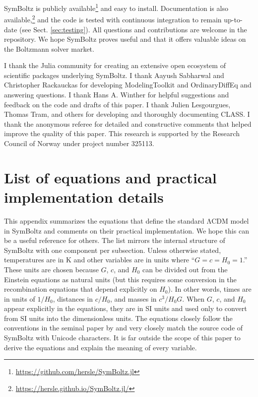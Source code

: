 \documentclass{aa}
\newcommand{\LCDM}{$\mathrm{\Lambda C D M}$}
\begin{document}
SymBoltz is publicly available\footnote{\url{https://github.com/hersle/SymBoltz.jl}} and easy to install.
Documentation is also available,\footnote{\url{https://hersle.github.io/SymBoltz.jl/}} and the code is tested with continuous integration to remain up-to-date (see Sect. \ref{sec:testing}).
All questions and contributions are welcome in the repository.
We hope SymBoltz proves useful and that it offers valuable ideas on the Boltzmann solver market.

\begin{acknowledgements}
I thank the Julia community for creating an extensive open ecosystem of scientific packages underlying SymBoltz.
I thank Aayush Sabharwal and Christopher Rackauckas for developing ModelingToolkit and OrdinaryDiffEq and answering questions.
I thank Hans A. Winther for helpful suggestions and feedback on the code and drafts of this paper.
I thank Julien Lesgourgues, Thomas Tram, and others for developing and thoroughly documenting CLASS.
I thank the anonymous referee for detailed and constructive comments that helped improve the quality of this paper.
This research is supported by the Research Council of Norway under project number 325113.
\end{acknowledgements}




\appendix
\onecolumn

\section{List of equations and practical implementation details}
\label{sec:implementation}

This appendix summarizes the equations that define the standard \LCDM{} model in SymBoltz and comments on their practical implementation.
We hope this can be a useful reference for others.
The list mirrors the internal structure of SymBoltz with one component per subsection.
Unless otherwise stated, temperatures are in $\mathrm{K}$ and other variables are in units where \enquote{$G = c = H_0 = 1$.}
These units are chosen because $G$, $c$, and $H_0$ can be divided out from the Einstein equations as natural units (but this requires some conversion in the recombination equations that depend explicitly on $H_0$).
In other words, times are in units of $1/H_0$, distances in $c/H_0$, and masses in $c^3/H_0 G$.
When $G$, $c$, and $H_0$ appear explicitly in the equations, they are in SI units and used only to convert from SI units into the dimensionless units.
The equations closely follow the conventions in the seminal paper by \citet{maCosmologicalPerturbationTheory1995} and very closely match the source code of SymBoltz with Unicode characters.
It is far outside the scope of this paper to derive the equations and explain the meaning of every variable.
\end{document}
